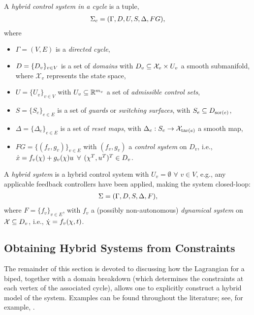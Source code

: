 \begin{definition} A {\em hybrid control system in a cycle} is a tuple,
  \begin{align}
    \Sigma_{c} = (\Gamma, D, U, S, \Delta, FG),
  \end{align}
  where
  \begin{itemize}
  \item $\Gamma = (V,E)$ is a {\em directed cycle},
  \item $D = \{D_{v}\}_{v \in V}$ is a set of {\em domains} with $D_{v} \subseteq \mathcal{X}_{v} \times U_v$ a smooth submanifold, where $\mathcal{X}_{v}$ represents the state space,
  \item $U = \{U_{v}\}_{v \in V}$ with $U_{v} \subseteq \mathbb{R}^{m_{v}}$ a set of {\em admissible control sets},
  \item $S = \{S_{e}\}_{e \in E}$ is a set of {\em guards} or {\em switching surfaces}, with $S_{e} \subseteq D_{\mathrm{sor}(e)}$,
  \item $\Delta = \{\Delta_{e}\}_{e \in E}$ is a set of {\em reset maps}, with $\Delta_{e} : S_{e} \to \mathcal{X}_{\mathrm{tar}(e)}$ a smooth map,
  \item $FG = \{(f_{v}, g_{v})\}_{v \in E}$ with $(f_v,g_v)$ a {\em control system} on $D_{v}$, i.e., $\dot{x} = f_{v}(\chi) + g_{v}(\chi) u$ $\forall$ $(\chi^{T}, u^{T})^{T} \in D_{v}$.
  \end{itemize}
\end{definition}

\begin{definition}
  A {\em hybrid system} is a hybrid control system with $U_v = \emptyset$ $\forall$ $v \in V$, e.g., any applicable feedback controllers have been applied, making the system closed-loop:
  \begin{align}
    \Sigma = (\Gamma, D, S, \Delta, F),
  \end{align}
  where $F = \{f_{v}\}_{v \in E}$, with $f_{v}$ a (possibly non-autonomous) {\em dynamical system} on $\mathcal{X} \subseteq D_{v}$, i.e., ${\dot {\chi}} = f_{v}(\chi,t)$.
\end{definition}

\subsection{Obtaining Hybrid Systems from Constraints}
The remainder of this section is devoted to discussing how the Lagrangian for a biped, together with a domain breakdown (which determines the constraints at each vertex of the associated cycle), allows one to explicitly construct a hybrid model of the system.
%
Examples can be found throughout the literature; see, for example, \cite{nolcos_2010_gcas_01,aut_2014_gcsa_01,cdc_2009_sa_01}.


